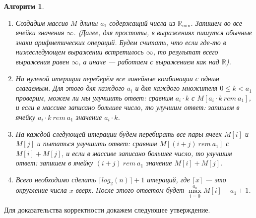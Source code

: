 \documentclass[12pt]{article}
\newtheorem{algorithm}[theorem]{Алгоритм}
\begin{document}
\begin{algorithm}
\label{algorithm2}
\begin{enumerate}
	\item Создадим массив $M$ длины $a_1$ содержащий числа из $\mathbb{R}_{\min}$. Запишем во все ячейки значения $\infty$. (Далее, для простоты, в выражениях пишутся обычные знаки арифметических операций. Будем считать, что если где-то в нижеследующем выражении встретилось $\infty$, то результат всего выражения равен $\infty$, а иначе --- работаем с выражением как над $\mathbb{R}$).
	
	\item На нулевой итерации переберём все линейные комбинации с одним слагаемым. Для этого для каждого $a_i$ и для каждого множителя $0 \le k < a_1$ проверим, можем ли мы улучшить ответ: сравним $a_i \cdot k$ с $M[a_i \cdot k \ rem \ a_1]$, и если в массиве записано большее число, то улучшим ответ: запишем в ячейку $a_i \cdot k \ rem \ a_1$ значение $a_i \cdot k$.
	
	\item На каждой следующей итерации будем перебирать все пары ячеек $M[i]$ и $M[j]$ и пытаться улучшить ответ: сравним $M[(i + j) \ rem \ a_1]$ с $M[i] + M[j]$, и если в массиве записано большее число, то улучшим ответ: запишем в ячейку $(i + j) \ rem \ a_1$ значение $M[i] + M[j]$.
	
	\item Всего необходимо сделать $\lceil log_2(n) \rceil + 1$ итераций, где $\lceil x \rceil$ --- это округление числа $x$ вверх. После 
этого ответом будет $\max\limits_{i = 0}^{a_0} M[i] - a_1 + 1$.
\end{enumerate}
\end{algorithm}

Для доказательства корректности докажем следующее утверждение.
\end{document}
